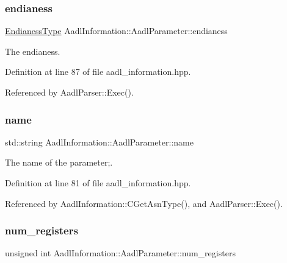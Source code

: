 \subsubsection{\texorpdfstring{endianess}{endianess}}
{\footnotesize\ttfamily \hyperlink{structAadlInformation_1_1AadlParameter_a1b095cc6220ca218732206b6c3994192}{Endianess\+Type} Aadl\+Information\+::\+Aadl\+Parameter\+::endianess}



The endianess. 



Definition at line 87 of file aadl\+\_\+information.\+hpp.



Referenced by Aadl\+Parser\+::\+Exec().

\mbox{\label{structAadlInformation_1_1AadlParameter_a194c78854a75d7569ceb24985173e9da}} 
\subsubsection{\texorpdfstring{name}{name}}
{\footnotesize\ttfamily std\+::string Aadl\+Information\+::\+Aadl\+Parameter\+::name}



The name of the parameter;. 



Definition at line 81 of file aadl\+\_\+information.\+hpp.



Referenced by Aadl\+Information\+::\+C\+Get\+Asn\+Type(), and Aadl\+Parser\+::\+Exec().

\mbox{\label{structAadlInformation_1_1AadlParameter_a7ee0fc3dd62cdd90789aee42872fe178}} 
\subsubsection{\texorpdfstring{num\+\_\+registers}{num\_registers}}
{\footnotesize\ttfamily unsigned int Aadl\+Information\+::\+Aadl\+Parameter\+::num\+\_\+registers}



